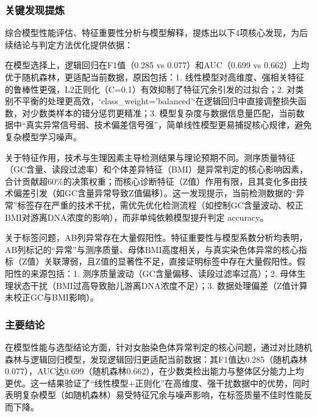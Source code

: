 \documentclass[withoutpreface,bwprint]{cumcmthesis} %
\begin{document}
\subsubsection{关键发现提炼}
综合模型性能评估、特征重要性分析与模型解释，提炼出以下4项核心发现，为后续结论与判定方法优化提供依据：

在模型选择上，逻辑回归在F1值（0.285 vs 0.077）和AUC（0.699 vs 0.662）上均优于随机森林，更适配当前数据，原因包括：1. 线性模型对高维度、强相关特征的鲁棒性更强，L2正则化（C=0.1）有效抑制了特征冗余引发的过拟合；2. 对类别不平衡的处理更高效，`class\_weight='balanced'`在逻辑回归中直接调整损失函数，对少数类样本的错分惩罚更精准；3. 模型复杂度与数据信息量匹配，当前数据中“真实异常信号弱、技术偏差信号强”，简单线性模型更易捕捉核心规律，避免复杂模型学习噪声。

关于特征作用，技术与生理因素主导检测结果与理论预期不同。测序质量特征（GC含量、读段过滤率）和个体差异特征（BMI）是异常判定的核心影响因素，合计贡献超60\%的决策权重；而核心诊断特征（Z值）作用有限，且其变化多由技术偏差引发（如GC含量异常导致Z值偏移）。这一发现提示，当前检测数据的“异常”标签存在严重的技术干扰，需优先优化检测流程（如控制GC含量波动、校正BMI对游离DNA浓度的影响），而非单纯依赖模型提升判定 accuracy。

关于标签问题，AB列异常存在大量假阳性。特征重要性与模型系数分析均表明，AB列标记的“异常”与测序质量、母体BMI高度相关，与真实染色体异常的核心指标（Z值）关联薄弱，且Z值的显著性不足，直接证明标签中存在大量假阳性。假阳性的来源包括：1. 测序质量波动（GC含量偏移、读段过滤率过高）；2. 母体生理状态干扰（BMI过高导致胎儿游离DNA浓度不足）；3. 数据处理偏差（Z值计算未校正GC与BMI影响）。

\subsubsection{主要结论}
在模型性能与选型结论方面，针对女胎染色体异常判定的核心问题，通过对比随机森林与逻辑回归模型，发现逻辑回归更适配当前数据：其F1值达0.285（随机森林0.077），AUC达0.699（随机森林0.662），在少数类检出能力与整体区分能力上均更优。这一结果验证了“线性模型+正则化”在高维度、强干扰数据中的优势，同时表明复杂模型（如随机森林）易受特征冗余与噪声影响，在标签质量不佳时性能反而下降。
\end{document}
